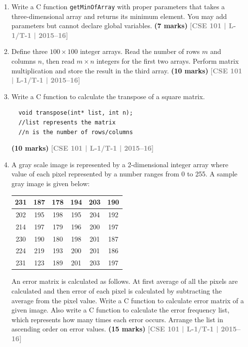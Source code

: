 \documentclass[12pt,a3paper]{article}
\newcommand{\yr}[1]{\hfill\textcolor{gray}{\small\textbf{[#1]}}}
\newcommand{\mk}[1]{\textcolor{orange!70!black}{\small\textbf{(#1 marks)}}}
\begin{document}
\begin{enumerate}
Write a C function \texttt{isMagicSquare(int n, int A[][n])} that returns 1 if the $n \times n$ matrix \texttt{A} is a magic square
, and 0 otherwise.
\mk{13} \yr{CSE 101 | L-1/T-1 | 2015--16}

\item Write a C function \texttt{getMinOfArray} with proper parameters that takes a three-dimensional array and returns its minimum element. You may add parameters but cannot declare global variables.
\mk{7} \yr{CSE 101 | L-1/T-1 | 2015--16}

\item Define three $100 \times 100$ integer arrays. Read the number of rows $m$ and columns $n$, then read $m \times n$ integers for the first two arrays. Perform matrix multiplication and store the result in the third array.
\mk{10} \yr{CSE 101 | L-1/T-1 | 2015--16}

\item Write a C function to calculate the transpose of a square matrix.
\begin{lstlisting}
  void transpose(int* list, int n);
  //list represents the matrix
  //n is the number of rows/columns
\end{lstlisting}

\mk{10} \yr{CSE 101 | L-1/T-1 | 2015--16}

\item A gray scale image is represented by a 2-dimensional integer array where value of each
    pixel represented by a number ranges from 0 to 255. A sample gray image is given
    below:

    \begin{center}
    \begin{tabular}{|c|c|c|c|c|c|}
    \hline
    231 & 187 & 178 & 194 & 203 & 190 \\
    \hline
    202 & 195 & 198 & 195 & 204 & 192 \\
    \hline
    214 & 197 & 179 & 196 & 200 & 197 \\
    \hline
    230 & 190 & 180 & 198 & 201 & 187 \\
    \hline
    224 & 219 & 193 & 200 & 201 & 186 \\
    \hline
    231 & 123 & 189 & 201 & 203 & 197 \\
    \hline
    \end{tabular}
    \end{center}

    An error matrix is calculated as follows. At first average of all the pixels are calculated
    and then error of each pixel is calculated by subtracting the average from the pixel value.
    Write a C function to calculate error matrix of a given image. Also write a C function to
    calculate the error frequency list, which represents how many times each error occurs.
    Arrange the list in ascending order on error values.
\mk{15} \yr{CSE 101 | L-1/T-1 | 2015--16}


\end{enumerate}
\end{document}
